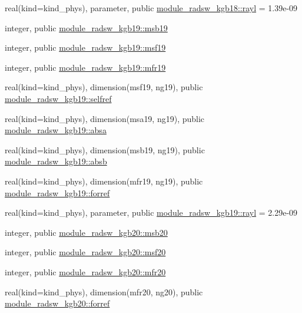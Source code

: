 \begin{DoxyCompactItemize}
\item 
real(kind=kind\+\_\+phys), parameter, public \hyperlink{group__module__radsw__main_ga9cd3f07e259e4982c7ef2889fee6cccb}{module\+\_\+radsw\+\_\+kgb18\+::rayl} = 1.\+39e-\/09
\item 
integer, public \hyperlink{group__module__radsw__main_ga42771fcf9dd17b5c9d0d03cb2bf1c923}{module\+\_\+radsw\+\_\+kgb19\+::msb19}
\item 
integer, public \hyperlink{group__module__radsw__main_ga86778b12ff439f4f83fda891e7ae2bfe}{module\+\_\+radsw\+\_\+kgb19\+::msf19}
\item 
integer, public \hyperlink{group__module__radsw__main_ga57f837ef4316dc2441bca3fde3998156}{module\+\_\+radsw\+\_\+kgb19\+::mfr19}
\item 
real(kind=kind\+\_\+phys), dimension(msf19, ng19), public \hyperlink{group__module__radsw__main_gadb26cae00c05ac5c048a4db5a319a2eb}{module\+\_\+radsw\+\_\+kgb19\+::selfref}
\item 
real(kind=kind\+\_\+phys), dimension(msa19, ng19), public \hyperlink{group__module__radsw__main_gad9a6fc80122a2f06d9f2277d74e00c85}{module\+\_\+radsw\+\_\+kgb19\+::absa}
\item 
real(kind=kind\+\_\+phys), dimension(msb19, ng19), public \hyperlink{group__module__radsw__main_gad1171c012a1615c4b98eb3e95276867d}{module\+\_\+radsw\+\_\+kgb19\+::absb}
\item 
real(kind=kind\+\_\+phys), dimension(mfr19, ng19), public \hyperlink{group__module__radsw__main_gabb4c30ad8e82694b33df78bb2687df6d}{module\+\_\+radsw\+\_\+kgb19\+::forref}
\item 
real(kind=kind\+\_\+phys), parameter, public \hyperlink{group__module__radsw__main_gac79ad61e8d246d6075664df4201373d7}{module\+\_\+radsw\+\_\+kgb19\+::rayl} = 2.\+29e-\/09
\item 
integer, public \hyperlink{group__module__radsw__main_ga385f5b8c61ed1de7aa3bbb6bd65f522f}{module\+\_\+radsw\+\_\+kgb20\+::msb20}
\item 
integer, public \hyperlink{group__module__radsw__main_ga925dc2da02eef4edcf000a14525a7c7e}{module\+\_\+radsw\+\_\+kgb20\+::msf20}
\item 
integer, public \hyperlink{group__module__radsw__main_ga9c7964eeb3acb4a11757fce977b73022}{module\+\_\+radsw\+\_\+kgb20\+::mfr20}
\item 
real(kind=kind\+\_\+phys), dimension(mfr20, ng20), public \hyperlink{group__module__radsw__main_ga3a660a7564064ca9997af9f95a5293b9}{module\+\_\+radsw\+\_\+kgb20\+::forref}
\item 

\end{DoxyCompactItemize}

